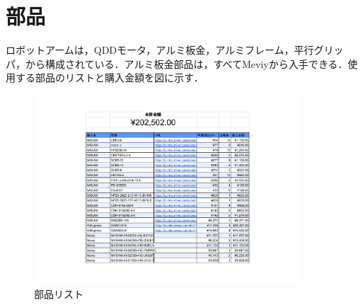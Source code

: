 \section{部品}
ロボットアームは，QDDモータ，アルミ板金，アルミフレーム，平行グリッパ，から構成されている．アルミ板金部品は，すべてMeviy\cite{Meviy:online}から入手できる．使用する部品のリストと購入金額を図に示す．
\begin{figure}[H]
  \centering
  \includegraphics[width=10cm]{images/product/rist.pdf}
  \caption{部品リスト}
  \label{fig:parts}
\end{figure}
\newpage